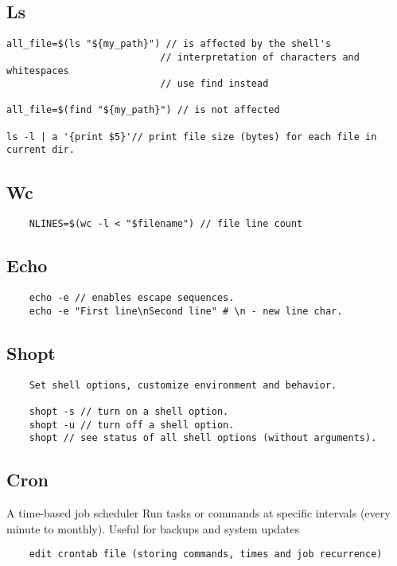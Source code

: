 \subsection{Ls}

\begin{verbatim}
all_file=$(ls "${my_path}") // is affected by the shell's
                           // interpretation of characters and whitespaces
                           // use find instead 

all_file=$(find "${my_path}") // is not affected

ls -l | a '{print $5}'// print file size (bytes) for each file in current dir.
\end{verbatim}

\subsection{Wc}

\begin{verbatim}
    NLINES=$(wc -l < "$filename") // file line count
\end{verbatim}

\subsection{Echo}
\begin{verbatim}
    echo -e // enables escape sequences.
    echo -e "First line\nSecond line" # \n - new line char.
\end{verbatim}

\subsection{Shopt}

\begin{verbatim}
    Set shell options, customize environment and behavior.

    shopt -s // turn on a shell option.
    shopt -u // turn off a shell option.
    shopt // see status of all shell options (without arguments).
\end{verbatim}

\subsection{Cron}

    A time-based job scheduler 
    Run tasks or commands at specific intervals (every minute to monthly). 
    Useful for backups and system updates 
\begin{verbatim}
    edit crontab file (storing commands, times and job recurrence)
\end{verbatim}

